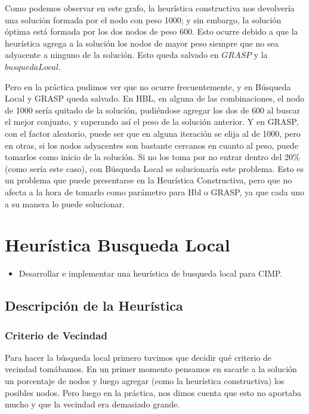 \documentclass[a4paper, 10pt]{article}
\begin{document}
Como podemos observar en este grafo, la heur\'istica constructiva nos devolver\'ia una soluci\'on formada por el nodo con peso 1000; y sin embargo, la soluci\'on \'optima est\'a formada por los dos nodos de peso 600. Esto ocurre debido a que la heur\'istica agrega a la soluci\'on los nodos de mayor peso siempre que no sea adyacente a ninguno de la soluci\'on. Esto queda salvado en $GRASP$ y la $busquedaLocal$.

Pero en la pr\'actica pudimos ver que no ocurre frecuentemente, y en B\'usqueda Local y GRASP queda salvado. En HBL, en alguna de las combinaciones, el nodo de 1000 ser\'ia quitado de la soluci\'on, pudi\'endose agregar los dos de 600 al buscar el mejor conjunto, y superando as\'i el peso de la soluci\'on anterior. Y en GRASP, con el factor aleatorio, puede ser que en alguna iteraci\'on se elija al de 1000, pero en otras, si los nodos adyacentes son bastante cercanos en cuanto al peso, puede tomarlos como inicio de la soluci\'on. Si no los toma por no entrar dentro del 20\% (como ser\'ia este caso), con B\'usqueda Local se solucionar\'ia este problema.
Esto es un problema que puede presentarse en la Heur\'istica Constructiva, pero que no afecta a la hora de tomarlo como par\'ametro para Hbl o GRASP, ya que cada uno a su manera lo puede solucionar.

\newpage

\section{Heur\'istica Busqueda Local}
\begin{itemize}
	\item Desarrollar e implementar una heur\'istica de busqueda local para CIMP.
\end{itemize}

\subsection{Descripci\'on de la Heur\'istica}
\subsubsection{Criterio de Vecindad}
Para hacer la b\'usqueda local primero tuvimos que decidir qu\'e criterio de vecindad tom\'abamos. En un primer momento pensamos en sacarle a la soluci\'on un porcentaje de nodos y luego agregar (como la heur\'istica constructiva) los posibles nodos. Pero luego en la pr\'actica, nos dimos cuenta que esto no aportaba mucho y que la vecindad era demasiado grande. \\
\end{document}

